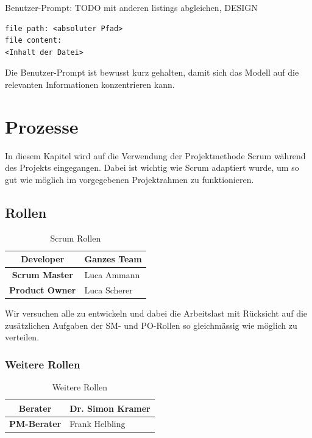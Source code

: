 \documentclass[a4paper,12pt]{report}
\begin{document}
    Benutzer-Prompt: TODO mit anderen listings abgleichen, DESIGN
    \begin{lstlisting}[label={lst:user-prompt}]
file path: <absoluter Pfad>
file content:
<Inhalt der Datei>
    \end{lstlisting}
    Die Benutzer-Prompt ist bewusst kurz gehalten, damit sich das Modell auf die relevanten Informationen konzentrieren kann.

    \clearpage


    \section{Prozesse}\label{sec:prozesse}
    In diesem Kapitel wird auf die Verwendung der Projektmethode Scrum während des Projekts eingegangen.
    Dabei ist wichtig wie Scrum adaptiert wurde, um so gut wie möglich im vorgegebenen Projektrahmen zu funktionieren.

    \subsection{Rollen}
    \begin{table}[h!]
        \centering
        \setlength{\leftmargini}{0.8cm}
        \begin{tabular}{|c|p{10cm}|}
            \hline
            \textbf{Developer}     & Ganzes Team  \\ \hline
            \textbf{Scrum Master}  & Luca Ammann  \\ \hline
            \textbf{Product Owner} & Luca Scherer \\ \hline
        \end{tabular}
        \caption{Scrum Rollen}\label{tab:scrum-roles}
    \end{table}
    Wir versuchen alle zu entwickeln und dabei die Arbeitslast mit Rücksicht auf die
    zusätzlichen Aufgaben der SM- und PO-Rollen so gleichmässig wie möglich zu verteilen.

    \subsubsection*{Weitere Rollen}
    \begin{table}[h!]
        \centering
        \setlength{\leftmargini}{0.8cm}
        \begin{tabular}{|c|p{10cm}|}
            \hline
            \textbf{Berater}    & Dr. Simon Kramer \\ \hline
            \textbf{PM-Berater} & Frank Helbling   \\ \hline
        \end{tabular}
        \caption{Weitere Rollen}\label{tab:additional-roles}
    \end{table}
\end{document}
